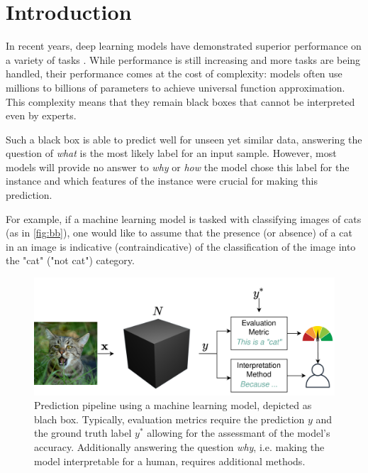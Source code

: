 \section{Introduction}
\label{sec:introduction}

In recent years, deep learning models have demonstrated superior performance on a variety of tasks \cite{ruede2020multi, brinker2019deep, nguyen2020super}. While performance is still increasing and more tasks are being handled, their performance comes at the cost of complexity: models often use millions to billions of parameters to achieve universal function approximation.
This complexity means that they remain black boxes that cannot be interpreted even by experts.

Such a black box is able to predict well for unseen yet similar data, answering the question of \textit{what} is the most likely label for an input sample. 
However, most models will provide no answer to \textit{why} or \textit{how} the model chose this label for the instance and which features of the instance were crucial for making this prediction. 

For example, if a machine learning model is tasked with classifying images of cats (as in \autoref{fig:bb}), one would like to assume that the presence (or absence) of a cat in an image is indicative (contraindicative) of the classification of the image into the "cat" ("not cat") category.

\begin{figure}[t]
    \centering
    \includegraphics[width=\linewidth]{figures/bb_cat.png}
    \caption{Prediction pipeline using a machine learning model, depicted as blach box. Typically, evaluation metrics require the prediction $y$ and the ground truth label $y^*$ allowing for the assessmant of the model's accuracy. Additionally answering the question \textit{why}, i.e. making the model interpretable for a human, requires additional methods.}
    \label{fig:bb}
    \vspace{-0.3cm}
\end{figure}

